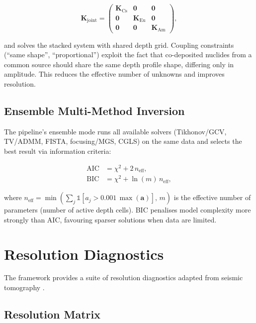 \documentclass[a4paper,11pt]{article}
\begin{document}
\begin{equation}
  \bm{K}_{\mathrm{joint}} = \begin{pmatrix}
    \bm{K}_{\mathrm{Cs}} & \bm{0} & \bm{0} \\
    \bm{0} & \bm{K}_{\mathrm{Eu}} & \bm{0} \\
    \bm{0} & \bm{0} & \bm{K}_{\mathrm{Am}}
  \end{pmatrix},
\end{equation}

and solves the stacked system with shared depth grid.  Coupling
constraints (``same shape'', ``proportional'') exploit the fact that
co-deposited nuclides from a common source should share the same depth
profile shape, differing only in amplitude.  This reduces the effective
number of unknowns and improves resolution.

\subsection{Ensemble Multi-Method Inversion}

The pipeline's ensemble mode runs all available solvers
(Tikhonov/GCV, TV/ADMM, FISTA, focusing/MGS, CGLS) on the same data
and selects the best result via information criteria:

\begin{align}
  \mathrm{AIC} &= \chi^2 + 2\,n_{\mathrm{eff}}, \\
  \mathrm{BIC} &= \chi^2 + \ln(m)\,n_{\mathrm{eff}},
\end{align}

where $n_{\mathrm{eff}} = \min(\sum_j \mathbb{1}[a_j > 0.001\,\max(\bm{a})],\, m)$
is the effective number of parameters (number of active depth cells).
BIC penalises model complexity more strongly than AIC, favouring
sparser solutions when data are limited.


\section{Resolution Diagnostics}\label{sec:diagnostics}

The framework provides a suite of resolution diagnostics adapted from
seismic tomography \citep{backus1968numerical,menke2018geophysical}.

\subsection{Resolution Matrix}
\end{document}
